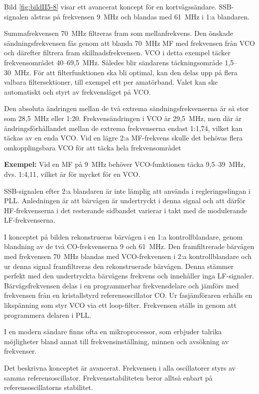 Bild \ref{fig:bildII5-8} visar ett avancerat koncept för en kortvågssändare.
SSB-signalen alstras på frekvensen 9~MHz och blandas med 61~MHz i 1:a
blandaren.

Summafrekvensen 70~MHz filtreras fram som mellanfrekvens.
Den önskade sändningsfrekvensen fås genom att blanda 70~MHz MF med
frekvensen från VCO och därefter filtrera fram skillnadsfrekvensen.
VCO i detta exempel täcker frekvensområdet 40--69,5~MHz.
Således blir sändarens täckningsområde 1,5--30~MHz.
För att filterfunktionen ska bli optimal, kan den delas upp på flera
valbara filtersektioner, till exempel ett per amatörband.
Valet kan ske automatiskt och styrt av frekvensläget på VCO.

Den absoluta ändringen mellan de två extrema sändningsfrekvenserna är
så stor som 28,5~MHz eller 1:20.
Frekvensändringen i VCO är 29,5~MHz, men där är ändringsförhållandet
mellan de extrema frekvenserna endast 1:1,74, vilket kan täckas av en enda VCO.
Vid en lägre 2:a MF-frekvens skulle det behövas flera omkopplingsbara
VCO för att täcka hela frekvensområdet

\textbf{Exempel:} Vid en MF på 9~MHz behöver VCO-funktionen täcka 9,5--39~MHz,
dvs. 1:4,11, vilket är för mycket för en VCO.

SSB-signalen efter 2:a blandaren är inte lämplig att använda i
regleringsslingan i PLL.
Anledningen är att bärvågen är undertryckt i denna signal och att därför
HF-frekvenserna i det resterande sidbandet varierar i takt med de
modulerande LF-frekvenserna.

I konceptet på bilden rekonstrueras bärvågen i en 1:a kontrollblandare,
genom blandning av de två CO-frekvenserna 9 och 61~MHz.
Den framfiltrerade bärvågen med frekvensen 70~MHz blandas med
VCO-frekvensen i 2:a kontrollblandare och ur denna signal
framfiltreras den rekonstruerade bärvågen.
Denna stämmer perfekt med den undertryckta bärvågens frekvens och
innehåller inga LF-signaler.
Bärvågsfrekvensen delas i en programmerbar frekvensdelare och jämförs
med frekvensen från en kristallstyrd referensoscillator CO.
Ur fasjämföraren erhålls en likspänning som styr VCO via ett loop-filter.
Frekvensen ställs in genom att programmera delaren i PLL.

I en modern sändare finns ofta en mikroprocessor, som erbjuder talrika
möjligheter bland annat till frekvensinställning, minnen och avsökning av
frekvenser.

Det beskrivna konceptet är avancerat.
Frekvensen i alla oscillatorer styrs av samma referensoscillator.
Frekvensstabiliteten beror alltså enbart på referensoscillatorns stabilitet.

